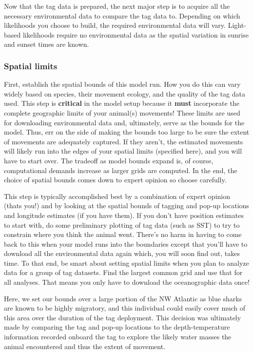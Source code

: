 \documentclass{article}\usepackage[]{graphicx}\usepackage[]{color}
\begin{document}
Now that the tag data is prepared, the next major step is to acquire all the necessary environmental data to compare the tag data to. Depending on which likelihoods you choose to build, the required environmental data will vary. Light-based likelihoods require no environmental data as the spatial variation in sunrise and sunset times are known.

\subsubsection{Spatial limits}
First, establish the spatial bounds of this model run. How you do this can vary widely based on species, their movement ecology, and the quality of the tag data used. This step is \textbf{critical} in the model setup because it \textbf{must} incorporate the complete geographic limits of your animal(s) movements! These limits are used for downloading environmental data and, ultimately, serve as the bounds for the model. Thus, err on the side of making the bounds too large to be sure the extent of movements are adequately captured. If they aren't, the estimated movements will likely run into the edges of your spatial limits (specified here), and you will have to start over. The tradeoff as model bounds expand is, of course, computational demands increase as larger grids are computed. In the end, the choice of spatial bounds comes down to expert opinion so choose carefully.

This step is typically accomplished best by a combination of expert opinion (thats you!) and by looking at the spatial bounds of tagging and pop-up locations and longitude estimates (if you have them). If you don't have position estimates to start with, do some preliminary plotting of tag data (such as SST) to try to constrain where you think the animal went. There's no harm in having to come back to this when your model runs into the boundaries except that you'll have to download all the environmental data again which, you will soon find out, takes time. To that end, be smart about setting spatial limits when you plan to analyze data for a group of tag datasets. Find the largest common grid and use that for all analyses. That means you only have to download the oceanographic data once!

Here, we set our bounds over a large portion of the NW Atlantic as blue sharks are known to be highly migratory, and this individual could easily cover much of this area over the duration of the tag deployment. This decision was ultimately made by comparing the tag and pop-up locations to the depth-temperature information recorded onboard the tag to explore the likely water masses the animal encountered and thus the extent of movement.
\end{document}
